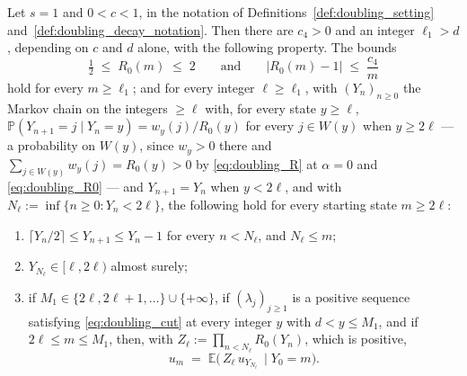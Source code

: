 \begin{lemma}\label{lem:doubling_descent}
Let $s=1$ and $0<c<1$, in the notation of Definitions~\ref{def:doubling_setting}
and~\ref{def:doubling_decay_notation}. Then there are
$c_4>0$ and an integer $\ell_1>d$, depending on $c$ and $d$ alone, with the following
property. The bounds
\begin{equation}\label{eq:doubling_R0}
    \tfrac12\;\leq\;R_0(m)\;\leq\;2
    \qquad\text{and}\qquad
    \bigl|R_0(m)-1\bigr|\;\leq\;\frac{c_4}{m}
\end{equation}
hold for every $m\geq\ell_1$; and for every integer $\ell\geq\ell_1$, with $(Y_n)_{n\geq0}$ the
Markov chain on the integers $\geq\ell$ with, for every state $y\geq\ell$,
$\mathbb P(Y_{n+1}=j\mid Y_n=y)=w_y(j)/R_0(y)$ for every $j\in W(y)$ when $y\geq2\ell$ --- a
probability on $W(y)$, since $w_y>0$ there and $\sum_{j\in W(y)}w_y(j)=R_0(y)>0$ by
\eqref{eq:doubling_R} at $\alpha=0$ and \eqref{eq:doubling_R0} --- and $Y_{n+1}=Y_n$ when
$y<2\ell$, and with $N_\ell:=\inf\{n\geq0:Y_n<2\ell\}$, the following hold for every starting
state $m\geq2\ell$:
\begin{enumerate}
    \item $\lceil Y_n/2\rceil\leq Y_{n+1}\leq Y_n-1$ for every $n<N_\ell$, and $N_\ell\leq m$;
    \item $Y_{N_\ell}\in[\ell,2\ell)$ almost surely;
    \item if $M_1\in\{2\ell,2\ell+1,\dots\}\cup\{+\infty\}$, if $(\lambda_j)_{j\geq1}$ is a
    positive sequence satisfying \eqref{eq:doubling_cut} at every integer $y$ with
    $d<y\leq M_1$, and if $2\ell\leq m\leq M_1$, then, with
    $Z_\ell:=\prod_{n<N_\ell}R_0(Y_n)$, which is positive,
    \begin{equation}\label{eq:doubling_pathid}
        u_m\;=\;\mathbb E\bigl(\,Z_\ell\,u_{Y_{N_\ell}}\,\mid Y_0=m\bigr) .
    \end{equation}
\end{enumerate}
\end{lemma}

